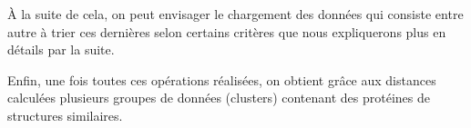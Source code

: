 À la suite de cela, on peut envisager le chargement des données qui consiste entre autre à trier ces dernières selon certains critères que nous expliquerons plus en détails par la suite.

Enfin, une fois toutes ces opérations réalisées, on obtient gr\^ace aux distances calculées plusieurs groupes de données (clusters) contenant des protéines de structures similaires.